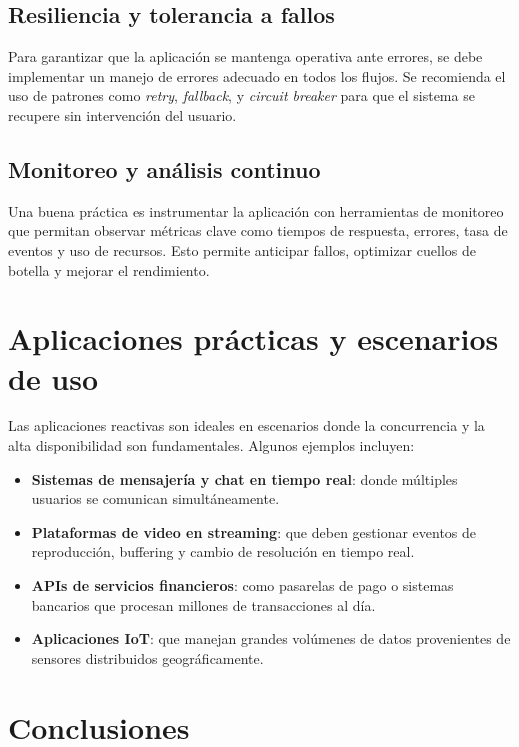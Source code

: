 \documentclass{article}
\begin{document}
\subsection{Resiliencia y tolerancia a fallos}

Para garantizar que la aplicación se mantenga operativa ante errores, se debe implementar un manejo de errores adecuado en todos los flujos. Se recomienda el uso de patrones como \textit{retry}, \textit{fallback}, y \textit{circuit breaker} para que el sistema se recupere sin intervención del usuario.

\subsection{Monitoreo y análisis continuo}

Una buena práctica es instrumentar la aplicación con herramientas de monitoreo que permitan observar métricas clave como tiempos de respuesta, errores, tasa de eventos y uso de recursos. Esto permite anticipar fallos, optimizar cuellos de botella y mejorar el rendimiento.

\section{Aplicaciones prácticas y escenarios de uso}

Las aplicaciones reactivas son ideales en escenarios donde la concurrencia y la alta disponibilidad son fundamentales. Algunos ejemplos incluyen:

\begin{itemize}
    \item \textbf{Sistemas de mensajería y chat en tiempo real}: donde múltiples usuarios se comunican simultáneamente.
    \item \textbf{Plataformas de video en streaming}: que deben gestionar eventos de reproducción, buffering y cambio de resolución en tiempo real.
    \item \textbf{APIs de servicios financieros}: como pasarelas de pago o sistemas bancarios que procesan millones de transacciones al día.
    \item \textbf{Aplicaciones IoT}: que manejan grandes volúmenes de datos provenientes de sensores distribuidos geográficamente.
\end{itemize}

\section{Conclusiones}
\end{document}
